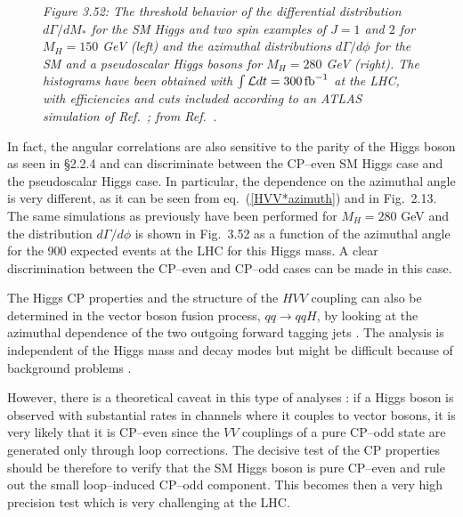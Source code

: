 \begin{figure}[htb!]
\begin{center}
\end{center}
\vspace*{-.5cm}
{\it Figure 3.52: The threshold behavior of the differential distribution
$d\Gamma/dM_*$ for the SM Higgs and two spin examples of $J=1$ and $2$ for
$M_H=150$ GeV (left) and the azimuthal distributions $d\Gamma/d\phi$ for the SM
and a pseudoscalar Higgs bosons for $M_H=280$ GeV (right). The histograms have
been obtained with $\int {\cal L} dt = 300\, {\rm fb}^{-1}$ at the LHC, with
efficiencies and cuts included according to an ATLAS simulation of 
Ref.~\cite{CPHVV-LHC2}; from 
Ref.~\cite{CPHVVchoi}. }
\vspace*{-.2cm}
\end{figure}
\noindent

In fact, the angular correlations are also sensitive to the parity of the Higgs
boson as seen in \S2.2.4 and can discriminate between the CP--even SM Higgs case
and the pseudoscalar Higgs case. In particular, the dependence on the azimuthal
angle is very different, as it can be seen from eq.~(\ref{HVV*azimuth}) and in
Fig.~2.13. The same simulations as previously \cite{CPHVVchoi,CPHVV-LHC2} have
been performed for $M_H=280$ GeV and the distribution $d\Gamma/d\phi$ is shown 
in Fig.~3.52 as a function of the azimuthal angle for the 900 expected events 
at the LHC for this Higgs mass. A clear discrimination between the CP--even and
CP--odd cases can be made in this case.  \s

The Higgs CP properties and the structure of the $HVV$ coupling can also be
determined in the vector boson fusion process, $qq \to qqH$,  by
looking at the azimuthal dependence of the two outgoing forward tagging jets
\cite{WVB-spin}. The analysis is independent of the Higgs mass 
and decay modes but might be difficult because of background problems 
\cite{pp-ggHqq,WVB-spin-back}. \s

However, there is a theoretical caveat in this type of analyses
\cite{JFG-Snowmass96}: if a Higgs boson is observed with substantial rates in
channels where it couples to vector bosons, it is very likely that it is
CP--even since the $VV$ couplings of a pure CP--odd state are generated only
through loop corrections. The decisive test of the CP properties should be
therefore to verify that the SM Higgs boson is pure CP--even and rule out the
small loop--induced CP--odd component. This becomes then a very high precision 
test which is very challenging at the LHC. \s

